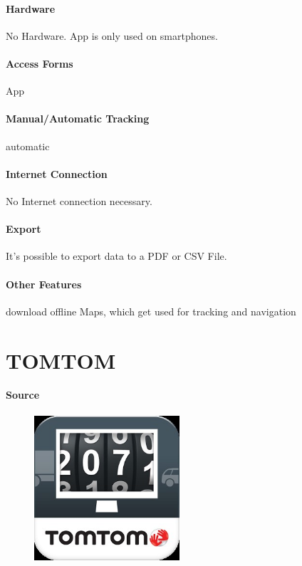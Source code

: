 \paragraph{Hardware} No Hardware. App is only used on smartphones.
\paragraph{Access Forms} App
\paragraph{Manual/Automatic Tracking} automatic
\paragraph{Internet Connection} No Internet connection necessary.
\paragraph{Export} It’s possible to export data to a PDF or CSV File.
\paragraph{Other Features} download offline Maps, which get used for tracking and navigation
\newpage

\section{TOMTOM}
\paragraph{Source} 
\begin{figure}
  \begin{center}
    \includegraphics[width=0.48\textwidth]{tomtom}
  \end{center}
\end{figure}
